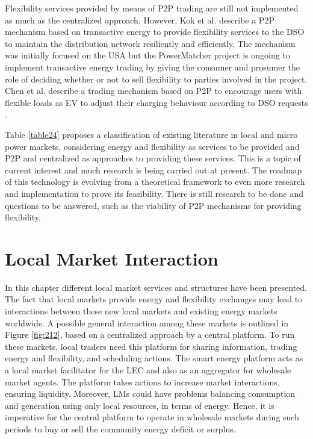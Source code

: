 Flexibility services provided by means of P2P trading are still not implemented as much as the centralized approach. However, Kok et al. \cite{kok2016society} describe a P2P mechanism based on transactive energy to provide flexibility services to the DSO to maintain the distribution network resiliently and efficiently. The mechanism was initially focused on the USA but the PowerMatcher project is ongoing to implement transactive energy trading by giving the consumer and prosumer the role of deciding whether or not to sell flexibility to parties involved in the project. Chen et al. describe a trading mechanism based on P2P to encourage users with flexible loads as EV to adjust their charging behaviour according to DSO requests \cite{chen2017integrated}.

Table \ref{table24} proposes a classification of existing literature in local and micro power markets, considering energy and flexibility as services to be provided and P2P and centralized as approaches to providing these services. This is a topic of current interest and much research is being carried out at present. The roadmap of this technology is evolving from a theoretical framework to even more research and implementation to prove its feasibility. There is still research to be done and questions to be answered, such as the viability of P2P mechanisms for providing flexibility.

\section{Local Market Interaction} \label{sec:interaction}
In this chapter different local market services and structures have been presented. The fact that local markets provide energy and flexibility exchanges may lead to interactions between these new local markets and existing energy markets worldwide. A possible general interaction among these markets is outlined in Figure \ref{fig:212}, based on a centralized approach by a central platform. To run these markets, local traders need this platform for sharing information, trading energy and flexibility, and scheduling actions. The smart energy platform acts as a local market facilitator for the LEC and also as an aggregator for wholesale market agents. The platform takes actions to increase market interactions, ensuring liquidity. Moreover, LMs could have problems balancing consumption and generation using only local resources, in terms of energy. Hence, it is imperative for the central platform to operate in wholesale markets during such periods to buy or sell the community energy deficit or surplus.

